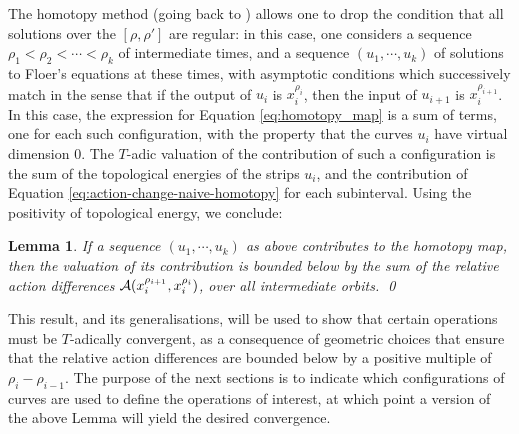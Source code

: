 \documentclass{article}
\theoremstyle{plain}%
\newtheorem{lem}[thm]{Lemma}
\theoremstyle{definition}
\numberwithin{equation}{section}
\numberwithin{figure}{section}
\def\cA{{\mathbin{\cal A}}}
\begin{document}
The homotopy method (going back to \cite[Section 19]{FOOO}) allows one to drop the condition that all solutions over the $[\rho,\rho']$ are regular: in this case, one considers a sequence $\rho_1 < \rho_2 < \cdots < \rho_k $ of intermediate times, and a sequence $(u_1, \cdots, u_k)$ of solutions to Floer's equations at these times, with asymptotic conditions which successively match in the sense that if the output of $u_i$ is $x_i^{\rho_i} $, then the input of $u_{i+1}$ is $x_{i}^{\rho_{i+1}}$. In this case, the expression for Equation \eqref{eq:homotopy_map} is a sum of terms, one for each such configuration, with the property that the curves $u_i$ have virtual dimension $0$. The $T$-adic valuation of the contribution of such a configuration is the sum of the topological energies of the strips $u_i$, and the contribution of Equation \eqref{eq:action-change-naive-homotopy} for each subinterval. Using the positivity of topological energy, we conclude:
\begin{lem}
  If a sequence $(u_1, \cdots, u_k)$ as above contributes to the homotopy map, then the valuation of its contribution is bounded below by the sum of the relative action differences $\cA(x_{i}^{\rho_{i+1}},x_{i}^{\rho_{i}})$, over all intermediate orbits. \qed
\end{lem}
This result, and its generalisations, will be used to show that certain operations must be $T$-adically convergent, as a consequence of geometric choices that ensure that the relative action differences are bounded below by a positive multiple of $\rho_{i} - \rho_{i-1}$. The purpose of the next sections is to indicate which configurations of curves are used to define the operations of interest, at which point a version of the above Lemma will yield the desired convergence.



\end{document}
